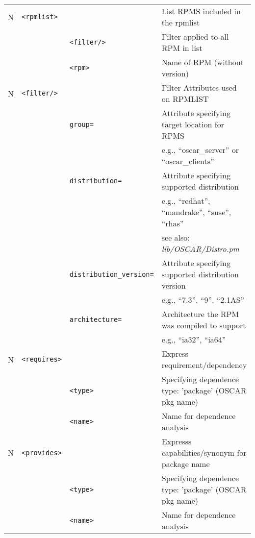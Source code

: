 \begin{table}[h!]
\begin{small}
\begin{center}
\begin{tabular}{|c|l|l|l|}
  N & \verb|<rpmlist>|
		&    
		& List RPMS included in the rpmlist         
		\\\cline{3-4}
%
	& 
		& \verb|<filter/>| 
		& Filter applied to all RPM in list         
		\\\cline{3-4}
%
    & 
		& \verb|<rpm>|    
		& Name of RPM (without version)             
		\\\hline

  N & \verb|<filter/>|
		&     
		& Filter Attributes used on RPMLIST                 
		\\\cline{3-4}
%
    & 
		& \verb|group=|   
		& Attribute specifying target location for RPMS     
		\\
    & 
		&                 
		& e.g., ``oscar\_server'' or ``oscar\_clients''     
		\\\cline{3-4}
%
    & 
		& \verb|distribution=|
		& Attribute specifying supported distribution   
		\\
    & 
		&                 
		& e.g., ``redhat'', ``mandrake'', ``suse'', ``rhas''
		\\
    & 
		&                 
		& see also: \emph{lib/OSCAR/Distro.pm}              
		\\\cline{3-4}
%
    & 
		& \verb|distribution_version=|
		& Attribute specifying supported distribution version  
		\\
    & 
		&                 
		& e.g., ``7.3'', ``9'', ``2.1AS''                   
		\\\cline{3-4}
%
    & 
		& \verb|architecture=|    
		& Architecture the RPM was compiled to support      
		\\
    & 
		&                 
		& e.g., ``ia32'', ``ia64''                          
		\\\hline

  N & \verb|<requires>|
  		&   
		& Express requirement/dependency 
		\\\cline{3-4}
%
    & 
		& \verb|<type>|    
		& Specifying dependence type: 'package'  (OSCAR pkg name)
		\\\cline{3-4}
	&
%
		& \verb|<name>|
		& Name for dependence analysis
		\\\hline

  N & \verb|<provides>|
  		&   
		& Expresss capabilities/synonym for package name
		\\\cline{3-4}
%
    & 
		& \verb|<type>|    
		& Specifying dependence type: 'package'  (OSCAR pkg name)
		\\\cline{3-4}
%
	&
		& \verb|<name>|
		& Name for dependence analysis
		\\\hline


\end{tabular}
\end{center}
\end{small}
\end{table}
